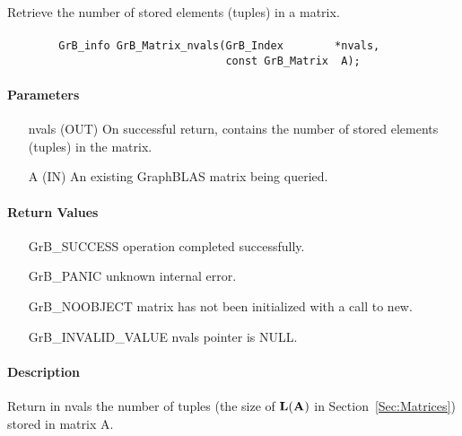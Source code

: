 Retrieve the number of stored elements (tuples) in a matrix.

\paragraph{\syntax}

\begin{verbatim}
        GrB_info GrB_Matrix_nvals(GrB_Index        *nvals,
                                  const GrB_Matrix  A);
\end{verbatim}

\paragraph{Parameters}

\begin{itemize}[leftmargin=1.1in]
    \item[{\sf nvals}] ({\sf OUT}) On successful return, contains the number of 
    stored elements (tuples) in the matrix.
    \item[{\sf A}] ({\sf IN}) An existing GraphBLAS matrix being queried.
\end{itemize}

\paragraph{Return Values}

\begin{itemize}[leftmargin=2.1in]
\item[{\sf GrB\_SUCCESS}]   operation completed successfully.
\item[{\sf GrB\_PANIC}]     unknown internal error.
\item[{\sf GrB\_NOOBJECT}]  matrix has not been initialized with a call to {\sf new}.
\item[{\sf GrB\_INVALID\_VALUE}]    {\sf nvals} pointer is {\sf NULL}.
\end{itemize}

\paragraph{Description}

Return in {\sf nvals} the number of tuples (the size of $\bold{L}({\bf A})$
in Section~\ref{Sec:Matrices}) stored in matrix {\sf A}.

